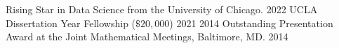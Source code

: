 


\begin{cvhonors}

  \cvhonor
    {{Rising Star in Data Science from the University of Chicago.} \href{https://datascience.uchicago.edu/research/postdoctoral-programs/rising-stars/2022/}{ }} %
    {2022} %
  \cvhonor
    {UCLA Dissertation Year Fellowship ($\$ 20,000$)} %
    {2021} %
  \cvhonor
    {2014 Outstanding Presentation Award at the Joint Mathematical Meetings, Baltimore, MD.} %
    {2014} %
\end{cvhonors}